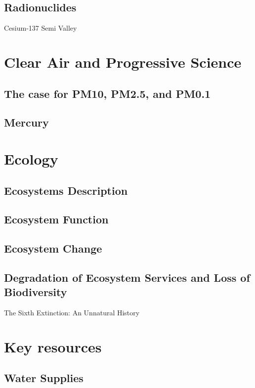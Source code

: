 \documentclass{tufte-book}\usepackage[]{graphicx}\usepackage[]{xcolor}
\begin{document}
\section{Radionuclides}

Cesium-137 Semi Valley

\chapter{Clear Air and Progressive Science}

\section{The case for PM10, PM2.5, and PM0.1}

\section{Mercury}

\chapter{Ecology}

\section{Ecosystems Description}

\section{Ecosystem Function}

\section{Ecosystem Change}

\section{Degradation of Ecosystem Services and Loss of Biodiversity}

The Sixth Extinction: An Unnatural History


\chapter{Key resources}

\section{Water Supplies}
\end{document}

